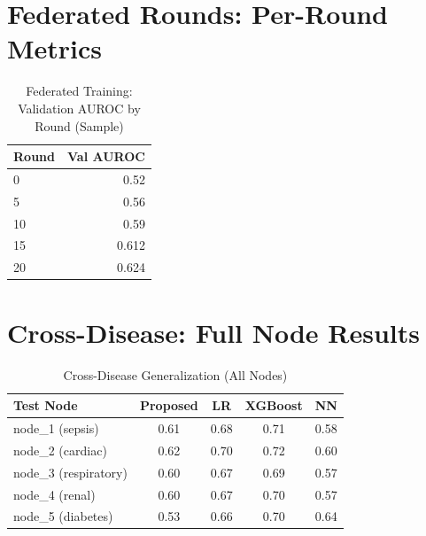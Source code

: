 \section{Federated Rounds: Per-Round Metrics}

\begin{table}[htbp]
\centering
\caption{Federated Training: Validation AUROC by Round (Sample)}
\begin{tabular}{lr}
\toprule
Round & Val AUROC \\
\midrule
0 & 0.52 \\
5 & 0.56 \\
10 & 0.59 \\
15 & 0.612 \\
20 & 0.624 \\
\bottomrule
\end{tabular}
\label{tab:fed_rounds}
\end{table}

\section{Cross-Disease: Full Node Results}

\begin{table}[htbp]
\centering
\caption{Cross-Disease Generalization (All Nodes)}
\begin{tabular}{lcccc}
\toprule
Test Node & Proposed & LR & XGBoost & NN \\
\midrule
node\_1 (sepsis) & 0.61 & 0.68 & 0.71 & 0.58 \\
node\_2 (cardiac) & 0.62 & 0.70 & 0.72 & 0.60 \\
node\_3 (respiratory) & 0.60 & 0.67 & 0.69 & 0.57 \\
node\_4 (renal) & 0.60 & 0.67 & 0.70 & 0.57 \\
node\_5 (diabetes) & 0.53 & 0.66 & 0.70 & 0.64 \\
\bottomrule
\end{tabular}
\label{tab:cross_disease_full}
\end{table}



